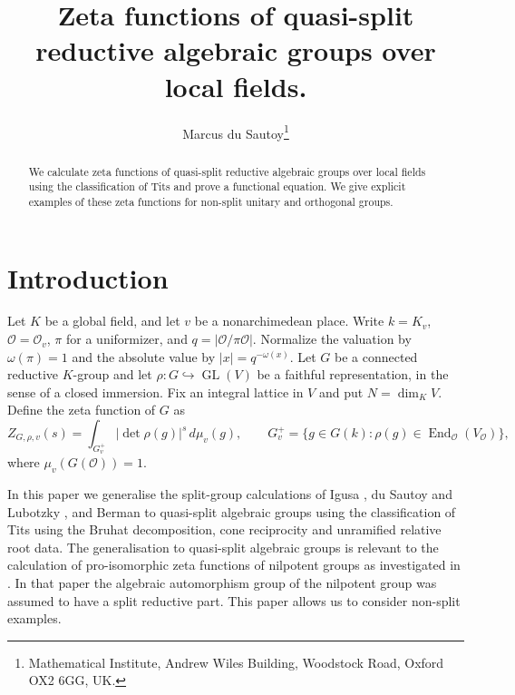 \documentclass[11pt,a4paper]{article}
\title{Zeta functions of quasi-split reductive algebraic groups over local fields.}
\author{Marcus du Sautoy\thanks{Mathematical Institute, Andrew Wiles Building,
Woodstock Road, Oxford OX2 6GG, UK.}}
\date{}
\theoremstyle{definition}
\newcommand{\OO}{\mathcal O}
\newcommand{\GL}{\operatorname{GL}}
\begin{document}
\maketitle
\begin{abstract}
We calculate zeta functions of quasi-split reductive algebraic groups over local fields using the classification of Tits and prove
a functional equation. We give explicit examples of these zeta functions for non-split unitary and orthogonal groups.
\end{abstract}
\tableofcontents

\section{Introduction}
Let $K$ be a global field, and let $v$ be a nonarchimedean place.
Write $k=K_v$, $\OO=\OO_v$, $\pi$ for a uniformizer, and
$q=|\OO/\pi\OO|$. Normalize the valuation by $\omega(\pi)=1$ and
the absolute value by $|x|=q^{-\omega(x)}$. Let $G$ be a connected
reductive $K$-group and let $\rho:G\hookrightarrow\GL(V)$ be a
faithful representation, in the sense of a closed immersion. Fix an
integral lattice in $V$ and put $N=\dim_K V$. Define the zeta function of $G$ as
\begin{equation}\label{eq:definition}
 Z_{G,\rho,v}(s)=\int_{G_v^+}|\det\rho(g)|^s\,d\mu_v(g),\qquad
 G_v^+=\{g\in G(k):\rho(g)\in\operatorname{End}_{\OO}(V_{\OO})\},
\end{equation}
where $\mu_v(G(\OO))=1$. 

In this paper we generalise the split-group calculations of Igusa \cite{Igusa}, du Sautoy and
Lubotzky \cite{duSL}, and Berman \cite{Berman} to quasi-split algebraic groups using the classification of Tits \cite{Tits} using the Bruhat decomposition, cone reciprocity and unramified
relative root data. The generalisation to quasi-split algebraic groups is relevant to the calculation of pro-isomorphic zeta functions of nilpotent groups as investigated in \cite{duSL}. In that paper the    algebraic automorphism group of the nilpotent group was assumed to have a split reductive part. This paper allows us to consider non-split examples.
\end{document}
